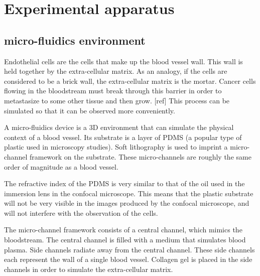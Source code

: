 
\chapter{Experimental apparatus}

\ifpdf
    \graphicspath{{Chapter4/Figs/Raster/}{Chapter4/Figs/PDF/}{Chapter4/Figs/}}
\else
    \graphicspath{{Chapter4/Figs/Vector/}{Chapter4/Figs/}}
\fi

\section{micro-fluidics environment}

Endothelial cells are the cells that make up the blood vessel wall. This wall is held together by the extra-cellular matrix. As an analogy, if the cells are considered to be a brick wall, the extra-cellular matrix is the mortar. Cancer cells flowing in the bloodstream must break through this barrier in order to metastasize to some other tissue and then grow. [ref] This process can be simulated so that it can be observed more conveniently.

A micro-fluidics device is a 3D environment that can simulate the physical context of a blood vessel. Its substrate is a layer of PDMS (a popular type of plastic used in microscopy studies). Soft lithography is used to imprint a micro-channel framework on the substrate. These micro-channels are roughly the same order of magnitude as a blood vessel.

The refractive index of the PDMS is very similar to that of the oil used in the immersion lens in the confocal microscope. This means that the plastic substrate will not be very visible in the images produced by the confocal microscope, and will not interfere with the observation of the cells.

The micro-channel framework consists of a central channel, which mimics the bloodstream. The central channel is filled with a medium that simulates blood plasma. Side channels radiate away from the central channel. These side channels each represent the wall of a single blood vessel. Collagen gel is placed in the side channels in order to simulate the extra-cellular matrix.

